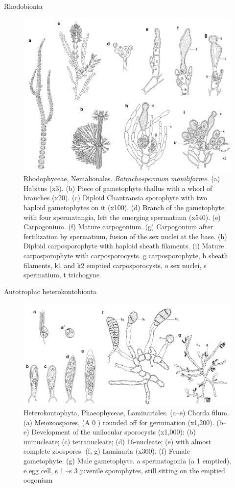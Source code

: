 \documentclass[ignorenonframetext,aspectratio=169]{beamer}
\begin{document}
\begin{frame}{Rhodobionta}
\protect\hypertarget{rhodobionta}{}

\begin{figure}
\includegraphics[width=0.45\linewidth]{./../images/rhodophyceae_nemalionales} \caption{Rhodophyceae, Nemalionales. \textit{Batrachospermum moniliforme}. (a) Habitus (x3). (b) Piece of gametophyte thallus with a whorl of branches (x20). (c) Diploid Chantransia sporophyte with two haploid gametophytes on it (x100). (d) Branch of the gametophyte with four spermatangia, left the emerging spermatium (x540). (e) Carpogonium. (f) Mature carpogonium. (g) Carpogonium after fertilization by spermatium, fusion of the sex nuclei at the base. (h) Diploid carposporophyte with haploid sheath filaments. (i) Mature carposporophyte with carposporocysts. g carposporophyte, h sheath filaments, k1 and k2 emptied carposporocysts, o sex nuclei, s spermatium, t trichogyne}\label{fig:rhodobionta}
\end{figure}

\end{frame}

\begin{frame}{Autotrophic heterokontobionta}
\protect\hypertarget{autotrophic-heterokontobionta}{}

\begin{figure}
\includegraphics[width=0.45\linewidth]{./../images/heterokontophyta_phaeophyceae} \caption{Heterokontophyta, Phaeophyceae, Laminariales. (a–e) Chorda filum. (a) Meiozoospores, (A 0 ) rounded off for germination (x1,200). (b–e) Development of the unilocular sporocysts (x1,000): (b) uninucleate; (c) tetranucleate; (d) 16-nucleate; (e) with almost complete zoospores. (f, g) Laminaria (x300). (f) Female gametophyte. (g) Male gametophyte. a spermatogonia (a 1 emptied), e egg cell, s 1 –s 3 juvenile sporophytes, still sitting on the emptied oogonium}\label{fig:heterokontophyta}
\end{figure}

\end{frame}
\end{document}
